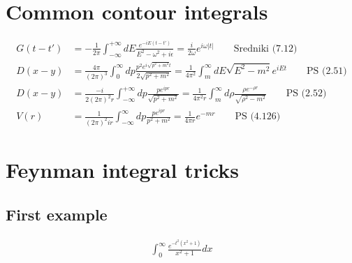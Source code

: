 \documentclass[10pt,a4paper]{book}
\theoremstyle{definition}
\begin{document}
\section{Common contour integrals}
\begin{align}
G(t-t')&=-\frac{1}{2\pi}\int_{-\infty}^{+\infty}dE\frac{e^{-iE(t-t')}}{E^2-\omega^2+i\epsilon}=\frac{i}{2\omega}e^{i\omega|t|}\qquad\text{Sredniki (7.12)}\\
D(x-y)&=\frac{4\pi}{(2\pi)^3}\int_{0}^{\infty} dp\frac{p^2 e^{i\sqrt{p^2+m^2}t}}{2\sqrt{p^2+m^2}}=\frac{1}{4\pi^2}\int_m^\infty dE\sqrt{E^2-m^2}e^{iEt}\qquad \text{PS (2.51)}\\
D(x-y)&=\frac{-i}{2(2\pi)^2r}\int_{-\infty}^{+\infty} dp\frac{p e^{ipr}}{\sqrt{p^2+m^2}}=\frac{1}{4\pi^2 r}\int_m^\infty d\rho\frac{\rho e^{-\rho r}}{\sqrt{\rho^2-m^2}}\qquad\text{PS (2.52)}\\
V(r)&=\frac{1}{(2\pi)^2ir}\int_{-\infty}^\infty dp\frac{p e^{ipr}}{p^2+m^2}=\frac{1}{4\pi r}e^{-mr}\qquad\text{PS (4.126)}
\end{align}

\section{Feynman integral tricks}
\subsection{First example}
\begin{align}
\int_{0}^{\infty}\frac{e^{-t^2(x^2+1)}}{x^2+1}dx
\end{align}
\end{document}
